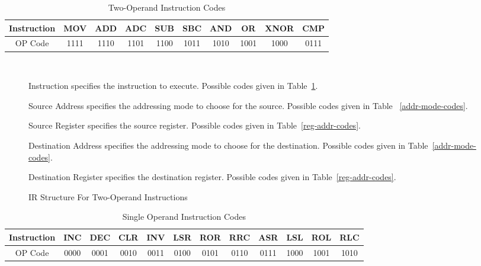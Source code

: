 \documentclass[12pt]{article}
\theoremstyle{plain}
\theoremstyle{definition}
\begin{document}
    \begin{table}[H]
        \centering
        \begin{tabular}{|c|c|c|c|c|c|c|c|c|c|}
        \hline
        Instruction & MOV  & ADD  & ADC  & SUB  & SBC  & AND  & OR   & XNOR & CMP  \\ \hline
        OP Code     & 1111 & 1110 & 1101 & 1100 & 1011 & 1010 & 1001 & 1000 & 0111 \\ \hline
        \end{tabular}
        \caption{Two-Operand Instruction Codes}
        \label{two-operand-op-codes}
    \end{table}
    \begin{figure}[H]
        \centering
        \caption{IR Structure For Two-Operand Instructions}
        \label{IR-TwoOp}
        \vspace{0.5 cm}
         \\
        \vspace{0.5 cm}
        \begin{regdesc}\begin{reglist}
            \item [Instruction] specifies the instruction to execute. Possible codes given in Table~\ref{two-operand-op-codes}.
            \item [Source Address] specifies the addressing mode to choose for the source. Possible codes given in Table ~\ref{addr-mode-codes}.
            \item [Source Register] specifies the source register. Possible codes given in Table~\ref{reg-addr-codes}.
            \item [Destination Address] specifies the addressing mode to choose for the destination. Possible codes given in Table~\ref{addr-mode-codes}.
            \item [Destination Register] specifies the destination register. Possible codes given in Table~\ref{reg-addr-codes}.
        \end{reglist}\end{regdesc}
    \end{figure}
    \begin{table}[H]
        \centering
        \begin{tabular}{|c|c|c|c|c|c|c|c|c|c|c|c|}
            \hline
            Instruction & INC  & DEC  & CLR  & INV  & LSR  & ROR  & RRC  & ASR & LSL & ROL & RLC  \\ \hline
            OP Code     & 0000 & 0001 & 0010 & 0011 & 0100 & 0101 & 0110 & 0111 & 1000 & 1001 & 1010 \\ \hline
        \end{tabular}
        \caption{Single Operand Instruction Codes}
        \label{single-operand-op-codes}
    \end{table}
\end{document}
